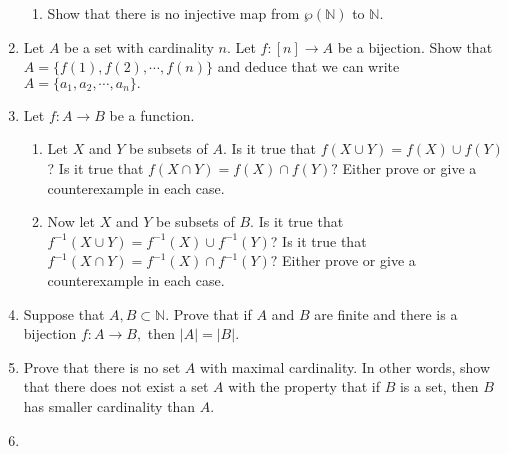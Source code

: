 \documentclass[11pt]{article}
\newcommand{\bbN}{\mathbb{N}}
\theoremstyle{definition}
\numberwithin{equation}{subsection}
\begin{document}
\begin{enumerate}
\begin{enumerate}
 
\item
Show that there is no injective map from $\wp(\bbN)$ to $\bbN.$
\end{enumerate}

\item Let $A$ be a set with cardinality $n.$ Let $f\colon [n]\longrightarrow A$ be a bijection. Show that $A=\{f(1),f(2),\cdots,f(n)\}$ and deduce that we can write $A=\{a_1,a_2,\cdots, a_n\}.$ 

\item Let $f: A \to B$ be a function. 
\begin{enumerate}
\item Let $X$ and $Y$ be subsets of $A$. Is it true that $f(X \cup Y) = f(X) \cup f(Y)$? Is it true that  
$f(X\cap Y)= f(X)\cap f(Y)?$ Either prove or give a counterexample in each case.


\item  Now let $X$ and $Y$ be subsets of $B$. Is it true that $f^{-1}(X \cup Y) = f^{-1}(X) \cup f^{-1}(Y)$? Is it true that $f^{-1}(X\cap Y)=f^{-1}(X)\cap f^{-1} (Y)?$ Either prove or give a counterexample in each case.
\end{enumerate}



\item
Suppose that $A,B\subset \mathbb{N}.$ Prove that if $A$ and $B$ are finite and there is a bijection $f:A\to B,$ then $|A|=|B|.$


\item
	Prove that there is no set $A$ with maximal cardinality.  In other words, show that there does not exist a set $A$ with the property that if $B$ is a set, then $B$ has smaller cardinality than $A$.





\item


\end{enumerate}
\end{document}
